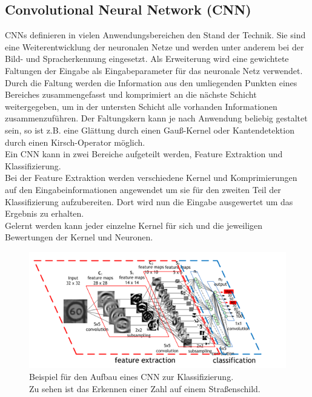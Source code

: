 \subsection{Convolutional Neural Network (CNN)}
CNNs definieren in vielen Anwendungsbereichen den Stand der Technik. Sie sind eine Weiterentwicklung der neuronalen Netze und werden unter anderem bei der Bild- und Spracherkennung eingesetzt. Als Erweiterung wird eine gewichtete Faltungen der Eingabe als Eingabeparameter für das neuronale Netz verwendet.\\
Durch die Faltung werden die Information aus den umliegenden Punkten eines Bereiches zusammengefasst und komprimiert an die nächste Schicht weitergegeben, um in der untersten Schicht alle vorhanden Informationen zusammenzuführen. Der Faltungskern kann je nach Anwendung beliebig gestaltet sein, so ist z.B. eine Glättung durch einen Gauß-Kernel oder Kantendetektion durch einen Kirsch-Operator möglich.\\
Ein CNN kann in zwei Bereiche aufgeteilt werden, Feature Extraktion und Klassifizierung.\\
Bei der Feature Extraktion werden verschiedene Kernel und Komprimierungen auf den Eingabeinformationen angewendet um sie für den zweiten Teil der Klassifizierung aufzubereiten. Dort wird nun die Eingabe ausgewertet um das Ergebnis zu erhalten.\\
Gelernt werden kann jeder einzelne Kernel für sich und die jeweiligen Bewertungen der Kernel und Neuronen.
\cite{pdf_CNN}\cite{wiki_CNN}
\begin{figure}
	\centering
	\includegraphics[width=0.9\linewidth]{img/cnn}
	\caption{Beispiel für den Aufbau eines CNN zur Klassifizierung.\\Zu sehen ist das Erkennen einer Zahl auf einem Straßenschild.\cite{bild_CNN}}
	\label{img_cnn}
\end{figure}
